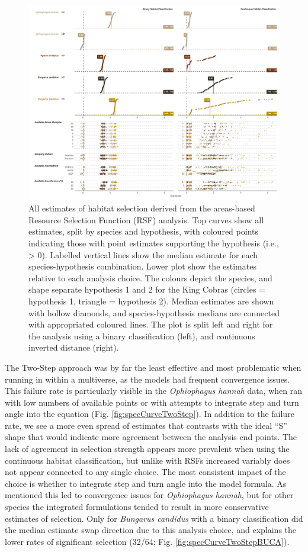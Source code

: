 \documentclass[10pt,a4paper]{article}
\begin{document}
\begin{figure}
\includegraphics[width=1\linewidth]{../../figures/specCurve_rsf} \caption{All estimates of habitat selection derived from the areas-based Resource Selection Function (RSF) analysis. Top curves show all estimates, split by species and hypothesis, with coloured points indicating those with point estimates supporting the hypothesis (i.e., > 0). Labelled vertical lines show the median estimate for each species-hypothesis combination. Lower plot show the estimates relative to each analysis choice. The colours depict the species, and shape separate hypothesis 1 and 2 for the King Cobras (circles = hypothesis 1, triangle = hypothesis 2). Median estimates are shown with hollow diamonds, and species-hypothesis medians are connected with appropriated coloured lines. The plot is split left and right for the analysis using a binary classification (left), and continuous inverted distance (right).}\label{fig:specCurveRsf}
\end{figure}

The Two-Step approach was by far the least effective and most problematic when running in within a multiverse, as the models had frequent convergence issues.
This failure rate is particularly visible in the \emph{Ophiophagus hannah} data, when ran with low numbers of available points or with attempts to integrate step and turn angle into the equation (Fig. \ref{fig:specCurveTwoStep}).
In addition to the failure rate, we see a more even spread of estimates that contrasts with the ideal ``S'' shape that would indicate more agreement between the analysis end points.
The lack of agreement in selection strength appears more prevalent when using the continuous habitat classification, but unlike with RSFs increased variably does not appear connected to any single choice.
The most consistent impact of the choice is whether to integrate step and turn angle into the model formula.
As mentioned this led to convergence issues for \emph{Ophiophagus hannah}, but for other species the integrated formulations tended to result in more conservative estimates of selection.
Only for \emph{Bungarus candidus} with a binary classification did the median estimate swap direction due to this analysis choice, and explains the lower rates of significant selection (32/64; Fig. \ref{fig:specCurveTwoStepBUCA}).
\end{document}
